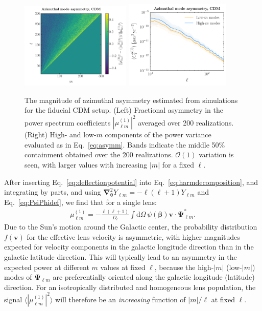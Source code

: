 \documentclass[twocolumn]{aastex63}
\newcommand{\vect}[1]{\boldsymbol{\mathbf{#1}}}
\newcommand{\dd}{\mathrm{d}}
\newcommand{\ellm}{{\ell m}}
\begin{document}
\begin{figure}[!htbp]
  \centering
  \includegraphics[width=0.47\textwidth]{plots/m_asymm_1}
  \includegraphics[width=0.45\textwidth]{plots/m_asymm_2}
  \caption{The magnitude of azimuthal asymmetry estimated from simulations for the fiducial CDM setup. (Left) Fractional asymmetry in the power spectrum coefficients $|\mu_\ellm^{(1)}|^2$ averaged over 200 realizations. (Right) High- and low-$m$ components of the power variance evaluated as in Eq.~\ref{eq:asymm}. Bands indicate the middle 50\% containment obtained over the 200 realizations.  $\mathcal{O}(1)$ variation is seen, with larger values with increasing $|m|$ for a fixed $\ell$.}
  \label{fig:m_asymm}
\end{figure}

After inserting Eq.~\ref{eq:deflectionpotential} into Eq.~\ref{eq:harmdecomposition}, and integrating by parts, and using $\vect{\nabla}_{\vect{\theta}}^2 Y_{\ell m} = - \ell (\ell + 1) Y_{\ell m}$ and Eq.~\ref{eq:PsiPhidef}, we find that for a single lens:
\begin{align}
\mu_{\ell m}^{(1)} = - \frac{\ell (\ell + 1)}{D_l} \int \dd \Omega \, \psi(\vect{\beta}) \vect{v} \cdot \vect{\Psi}_{\ell m}^*.
\end{align}
Due to the Sun's motion around the Galactic center, the probability distribution $f(\vect{v})$ for the effective lens velocity is asymmetric, with higher magnitudes expected for velocity components in the galactic longitude direction than in the galactic latitude direction. This will typically lead to an asymmetry in the expected power at different $m$ values at fixed $\ell$, because the high-$|m|$ (low-$|m|$) modes of $\vect{\Psi}_{\ell m}$ are preferentially oriented along the galactic longitude (latitude) direction. For an isotropically distributed and homogeneous lens population, the signal $\langle |\mu_{\ell m}^{(1)}|^2 \rangle$ will therefore be an \emph{increasing} function of $|m|/\ell$ at fixed $\ell$.
\end{document}
